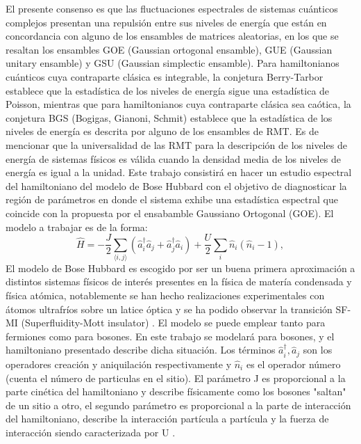 \documentclass[spanish,titlepage,table]{practicas}
\begin{document}
El presente consenso es que las fluctuaciones espectrales de sistemas cuánticos complejos presentan 
una repulsión entre sus niveles de energía que están en concordancia con alguno de los ensambles de matrices 
aleatorias, en los que se resaltan los ensambles GOE (Gaussian ortogonal ensamble), GUE (Gaussian unitary ensamble) y GSU (Gaussian simplectic ensamble).
\newline
Para hamiltonianos cuánticos cuya contraparte clásica es integrable, la conjetura Berry-Tarbor establece que 
la estadística de los niveles de energía sigue una estadística de Poisson, mientras que para hamiltonianos 
cuya contraparte clásica sea caótica, la conjetura BGS (Bogigas, Gianoni, Schmit) establece que la estadística de los niveles de energía es descrita 
por alguno de los ensambles de RMT.\cite{Atas_2013}
Es de mencionar que la universalidad de las RMT para la descripción de los niveles de energía de sistemas físicos 
es válida cuando la densidad media de los niveles de energía es igual a la unidad. \cite{Atas_2013}
\newline
Este trabajo consistirá en hacer un estudio espectral del hamiltoniano del modelo de Bose Hubbard 
con el objetivo de diagnosticar la región de parámetros en donde el sistema exhibe una estadística espectral 
que coincide con la propuesta por el ensabamble Gaussiano Ortogonal (GOE). El modelo a trabajar es de la forma:
\[
\hat{H}
= -\frac{J}{2} \sum_{\langle i,j\rangle} \!\left(\hat{a}_i^{\dagger}\hat{a}_j + \hat{a}_j^{\dagger}\hat{a}_i\right)
+ \frac{U}{2}\sum_{i}\hat{n}_i(\hat{n}_i - 1),
\]
El modelo de Bose Hubbard es escogido por ser un buena primera aproximación a distintos sistemas físicos de interés presentes en la física de matería condensada y física atómica, notablemente 
se han hecho realizaciones experimentales con átomos ultrafríos sobre un latice óptica y se ha podido observar la transición SF-MI (Superfluidity-Mott insulator) \cite{Zhang2010}. 
El modelo se puede emplear tanto para fermiones como para bosones. En este trabajo se modelará para bosones, y el hamiltoniano presentado describe dicha situación.
Los términos $\hat{a}_i^{\dagger},\hat{a}_j$ son los operadores creación y aniquilación respectivamente y $\hat{n}_i$ es el operador número (cuenta el número de particulas en el sitio).
El parámetro J es proporcional a la parte cinética del hamiltoniano y describe físicamente como los bosones "saltan" de un sitio a otro, el segundo parámetro es proporcional a la parte de interacción del hamiltoniano, describe 
la interacción partícula a partícula y la fuerza de interacción siendo caracterizada por U \cite{Zhang2010}. 
\end{document}
